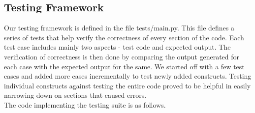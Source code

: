 \documentclass[a4paper]{article}
\begin{document}
\subsection{Testing Framework}
Our testing framework is defined in the file tests/main.py. This file defines a series of tests that help verify the correctness of every section of the code. Each test case includes mainly two aspects - test code and expected output. The verification of correctness is then done by comparing the output generated for each case with the expected output for the same. We started off with a few test cases and added more cases incrementally to test newly added constructs. Testing individual constructs against testing the entire code proved to be helpful in easily narrowing down on sections that caused errors.\\

\noindent The code implementing the testing suite is as follows.
\end{document}
